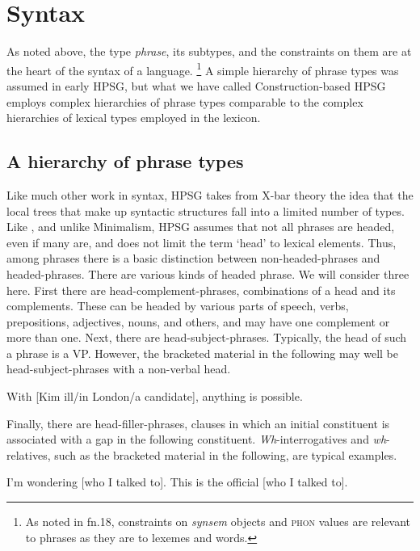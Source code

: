\documentclass[output=paper
	        ,collection
	        ,collectionchapter
 	        ,biblatex
                ,babelshorthands
                ,newtxmath
                ,draftmode
                ,colorlinks, citecolor=brown
]{langscibook}
\begin{document}
\section{Syntax}

As noted above, the type \emph{phrase}, its subtypes, and the constraints on them are at the heart of the syntax of a language.%
%
\footnote{As noted in fn.18, constraints on \emph{synsem} objects and \textsc{phon} values are relevant to phrases as they are to lexemes and words.}
%
A simple hierarchy of phrase types was assumed in early HPSG, but what we have called Construction-based HPSG employs complex hierarchies of phrase types comparable to the complex hierarchies of lexical types employed in the lexicon.

\subsection{A hierarchy of phrase types}

Like much other work in syntax, HPSG takes from X-bar theory \citep{Jackendoff77a} the idea that the local trees that make up syntactic structures fall into a limited number of types. Like \citet{Jackendoff77a}, and unlike Minimalism, HPSG assumes that not all phrases are headed, even if many are, and does not limit the term ‘head’ to lexical elements. Thus, among phrases there is a basic distinction between non-headed-phrases and headed-phrases. There are various kinds of headed phrase. We will consider three here. First there are head-complement-phrases, combinations of a head and its complements. These can be headed by various parts of speech, verbs, prepositions, adjectives, nouns, and others, and may have one complement or more than one. Next, there are head-subject-phrases. Typically, the head of such a phrase is a VP. However, the bracketed material in the following may well be head-subject-phrases with a non-verbal head. 

\ea\label{ex:prop29}
With [Kim ill/in London/a candidate], anything is possible.
\z

Finally, there are head-filler-phrases, clauses in which an initial constituent is associated with a gap in the following constituent. \emph{Wh}-interrogatives and \emph{wh}-relatives, such as the bracketed material in the following, are typical examples.

\ea\label{ex:prop30}
	\ea I’m wondering [who I talked to].
	\ex This is the official [who I talked to].
	\z
\z
\end{document}
